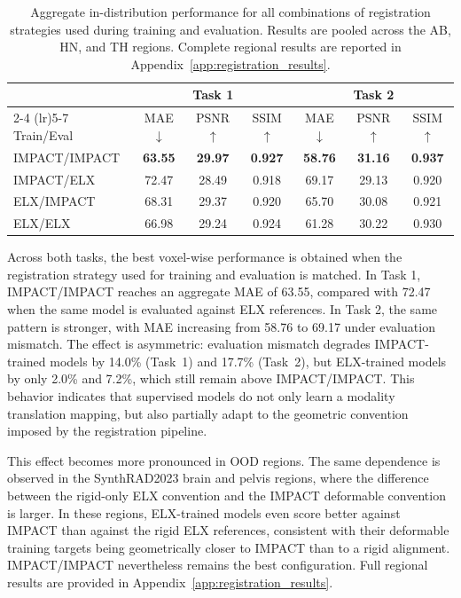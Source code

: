 \documentclass[lettersize,journal]{IEEEtran}
\begin{document}
\begin{table}[h!]
\centering
\fontsize{7.5}{9}\selectfont
\setlength{\tabcolsep}{2.2pt}
\renewcommand{\arraystretch}{1.18}
\caption{Aggregate in-distribution performance for all combinations of registration strategies used during training and evaluation. Results are pooled across the AB, HN, and TH regions. Complete regional results are reported in Appendix~\ref{app:registration_results}.
}
\label{tab:registration_consistency_aggregate}
\begin{tabular}{@{}lcccccc@{}}
\toprule
& \multicolumn{3}{c}{Task 1} & \multicolumn{3}{c}{Task 2} \\
\cmidrule(lr){2-4} \cmidrule(lr){5-7}
Train/Eval
& MAE $\downarrow$ & PSNR $\uparrow$ & SSIM $\uparrow$
& MAE $\downarrow$ & PSNR $\uparrow$ & SSIM $\uparrow$ \\
\midrule
IMPACT/IMPACT
& \textbf{63.55} & \textbf{29.97} & \textbf{0.927}
& \textbf{58.76} & \textbf{31.16} & \textbf{0.937} \\
IMPACT/ELX
& 72.47 & 28.49 & 0.918
& 69.17 & 29.13 & 0.920 \\
ELX/IMPACT
& 68.31 & 29.37 & 0.920
& 65.70 & 30.08 & 0.921 \\
ELX/ELX
& 66.98 & 29.24 & 0.924
& 61.28 & 30.22 & 0.930 \\
\bottomrule
\end{tabular}

\end{table}
\renewcommand{\arraystretch}{1}

Across both tasks, the best voxel-wise performance is obtained when the registration strategy used for training and evaluation is matched. In Task 1, IMPACT/IMPACT reaches an aggregate MAE of 63.55, compared with 72.47 when the same model is evaluated against ELX references. In Task 2, the same pattern is stronger, with MAE increasing from 58.76 to 69.17 under evaluation mismatch. The effect is asymmetric: evaluation mismatch degrades IMPACT-trained models by 14.0\% (Task~1) and 17.7\% (Task~2), but ELX-trained models by only 2.0\% and 7.2\%, which still remain above IMPACT/IMPACT. This behavior indicates that supervised models do not only learn a modality translation mapping, but also partially adapt to the geometric convention imposed by the registration pipeline.

This effect becomes more pronounced in OOD regions. The same dependence is observed in the SynthRAD2023 brain and pelvis regions, where the difference between the rigid-only ELX convention and the IMPACT deformable convention is larger. In these regions, ELX-trained models even score better against IMPACT than against the rigid ELX references, consistent with their deformable training targets being geometrically closer to IMPACT than to a rigid alignment. IMPACT/IMPACT nevertheless remains the best configuration. Full regional results are provided in Appendix~\ref{app:registration_results}.
\end{document}
